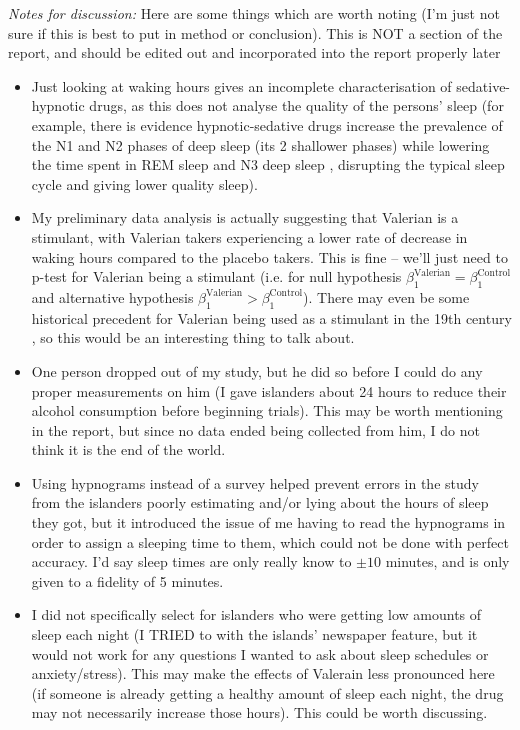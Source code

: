 \documentclass[10pt,preprintnumbers,amsmath,amssymb,floatfix,twocolumn,prl]{revtex4-2}
\begin{document}
\textit{Notes for discussion:} 
Here are some things which are worth noting (I'm just not sure if this is best to put in method or conclusion). This is NOT a section of the report, and should be edited out and incorporated into the report properly later
\begin{itemize}
\item Just looking at waking hours gives an incomplete characterisation of sedative-hypnotic drugs, as this does not analyse the quality of the persons' sleep (for example, there is evidence hypnotic-sedative drugs increase the prevalence of the N1 and N2 phases of deep sleep (its 2 shallower phases) while lowering the time spent in REM sleep and N3 deep sleep \cite{SleepCyclesSource}, disrupting the typical sleep cycle and giving lower quality sleep).

\item My preliminary data analysis is actually suggesting that Valerian is a stimulant, with Valerian takers experiencing a lower rate of decrease in waking hours compared to the placebo takers. This is fine -- we'll just need to p-test for Valerian being a stimulant (i.e. for null hypothesis $\beta_1^\text{Valerian} = \beta_1^\text{Control}$ and alternative hypothesis $\beta_1^\text{Valerian} > \beta_1^\text{Control}$). There may even be some historical precedent for Valerian being used as a stimulant in the 19th century \cite{ValerianSource2}, so this would be an interesting thing to talk about.

\item One person dropped out of my study, but he did so before I could do any proper measurements on him (I gave islanders about 24 hours to reduce their alcohol consumption before beginning trials). This may be worth mentioning in the report, but since no data ended being collected from him, I do not think it is the end of the world.

\item Using hypnograms instead of a survey helped prevent errors in the study from the islanders poorly estimating and/or lying about the hours of sleep they got, but it introduced the issue of me having to read the hypnograms in order to assign a sleeping time to them, which could not be done with perfect accuracy. I'd say sleep times are only really know to $\pm 10$ minutes, and is only given to a fidelity of 5 minutes.

\item I did not specifically select for islanders who were getting low amounts of sleep each night (I TRIED to with the islands' newspaper feature, but it would not work for any questions I wanted to ask about sleep schedules or anxiety/stress). This may make the effects of Valerain less pronounced here (if someone is already getting a healthy amount of sleep each night, the drug may not necessarily increase those hours). This could be worth discussing.
\end{itemize}



\end{document}

